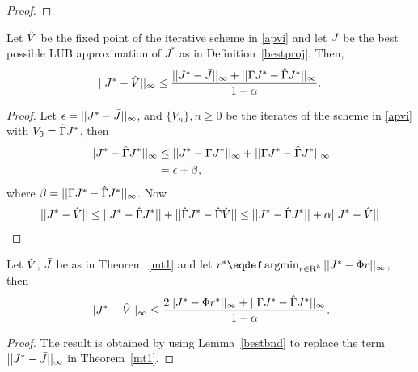 \begin{proof}
\begin{comment}
Now, for showing that $V_1 \le V_0$ holds, fix any $i$. We need to show that $(\hg V_0)(i) = \min_j (\Phi r_{e_j,V_0})(i) = (\Phi r_{e_i,V_0})(i)$ is less than $V_0(i)$. By the definition of $r_{e_j,V_0}$ we know that $(\Phi r_{e_i,V_0})(i) \le (\Phi r)(i)$
holds for any $r$ such that $W^\top E \Phi r \ge W^\top H V_0$. Thus, it suffices to show that $r_i$ satisfies this latter inequality,
i.e., $W^\top E \Phi r_i \ge W^\top H V_0$. For this, it clearly sufficient if $\Phi r_i \ge V_0$. This however directly follows 
from the definition of $V_0$.
}
Since $V_1=\hg V_0$, from the definition of $\hg$ in \eqref{gamdef} and the construction of $V_0$, we have $V_0\geq V_1$, and recursively $V_{n}\geq V_{n+1}, \mb n\geq 0$. So it follows that $\hj\geq V_0\geq V_1\ldots\geq \hv$.
\end{comment}
\end{proof}
\begin{theorem}\label{mt1}
Let $\hat{V}$ be the fixed point of the iterative scheme in \eqref{apvi} and let $\bar{J}$ be the best possible LUB approximation of $J^*$ as in Definition~\ref{bestproj}. Then,
\begin{align}
||J^*-\hat{V}||_\infty\leq \frac{||J^*-\bar{J}||_\infty+||\Gamma J^*-\hat{\Gamma} J^*||_\infty}{1-\alpha}.
\end{align}
\end{theorem}
\begin{proof}
Let $\epsilon=||J^*-\bar{J}||_\infty$, and $\{V_n\},n\geq 0$ be the iterates of the scheme in \eqref{apvi} with $V_0=\hat{\Gamma} J^*$, then
\begin{align}
||J^*-\hat{\Gamma} J^*||_\infty&\leq||J^*-\Gamma J^*||_\infty+||\Gamma J^*-\hat{\Gamma} J^*||_\infty\nonumber\\
&= \epsilon+\beta,
\end{align}
where $\beta=||\Gamma J^*-\hat{\Gamma} J^*||_\infty$. Now
\begin{align}
||J^*-\hat{V}||\leq ||J^*-\hat{\Gamma} J^*||+||\hat{\Gamma} J^*-\hat{\Gamma} \hat{V}||\leq ||J^*-\hat{\Gamma} J^*||+\alpha || J^*- \hat{V}||
\end{align}
\end{proof}
\begin{corollary}\label{cmt1}
Let $\hat{V}$, $\bar{J}$ be as in Theorem~\ref{mt1} and let $r^*\eqdef\argmin_{r\in \R^k}||J^*-\Phi r||_\infty$, then
\begin{align}
||J^*-\hat{V}||_\infty\leq \frac{2||J^*-\Phi r^*||_\infty+||\Gamma J^*-\hat{\Gamma} J^*||_\infty}{1-\alpha}.
\end{align}
\end{corollary}
\begin{proof}
The result is obtained by using Lemma~\ref{bestbnd} to replace the term $||J^*-\bar{J}||_\infty$ in Theorem~\ref{mt1}.
\end{proof}
